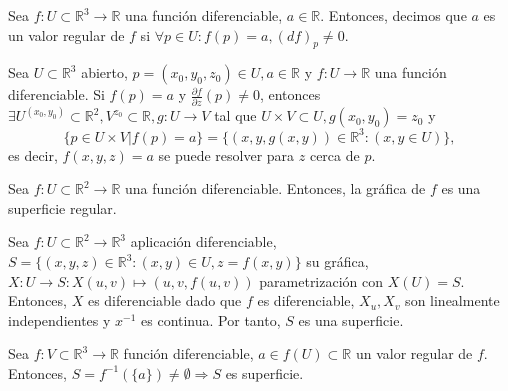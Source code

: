 \begin{defn}
  Sea $ f: U \subset \mathbb{R}^{3} \to \mathbb{R}$ una función diferenciable, $a \in \mathbb{R}$. Entonces, decimos que $a$ es un valor regular de $f$ si $\forall p \in U : f(p) = a, (df)_{p} \neq 0$.
\end{defn}

\begin{theo}
  Sea $U \subset \mathbb{R}^{3}$ abierto, $p = (x_{0}, y_{0}, z_{0}) \in U, a \in \mathbb{R}$ y $f: U \to \mathbb{R}$ una función diferenciable. Si $f(p) = a$ y $\frac{\partial{f}}{\partial{z}}(p) \neq 0$, entonces $\exists U^{(x_{0},y_{0})} \subset \mathbb{R}^{2}, V^{z_{0}} \subset \mathbb{R}, g: U \to V$ tal que $U \times V \subset U, g(x_{0}, y_{0}) = z_{0}$ y
  \[ 
    \{ p \in U \times V | f(p) = a \} = \big\{ (x,y,g(x,y)) \in \mathbb{R}^{3} : (x,y \in U) \big\} ,
  \] 
  es decir, $f(x,y,z) = a$ se puede resolver para $z$ cerca de $p$.
\end{theo}

\begin{prop}
  Sea $f : U \subset \mathbb{R}^{2} \to \mathbb{R}$ una función diferenciable. Entonces, la gráfica de $f$ es una superficie regular.
\end{prop}

\begin{dem}
  Sea $f : U \subset \mathbb{R}^{2} \to \mathbb{R}^{3}$ aplicación diferenciable, $S = \{ (x, y, z)\in \mathbb{R}^{3} : (x, y) \in U, z = f(x, y) \}$ su gráfica, $X : U \to S : X(u, v) \mapsto (u, v, f(u, v))$ parametrización con $X(U) = S$. Entonces, $X$ es diferenciable dado que $f$ es diferenciable, $X_{u}, X_{v}$ son linealmente independientes y $x^{-1}$ es continua. Por tanto, $S$ es una superficie.
\end{dem}

\begin{prop}
  Sea $f: V \subset \mathbb{R}^{3} \to \mathbb{R}$ función diferenciable, $a \in f(U) \subset \mathbb{R}$ un valor regular de $f$. Entonces, $S = f^{-1}(\{ a \}) \neq \emptyset \Rightarrow S$ es superficie.
\end{prop}

